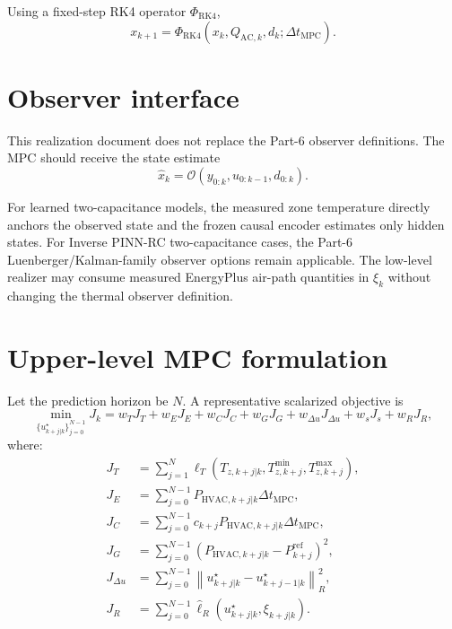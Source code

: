 \documentclass[11pt]{article}
\begin{document}
Using a fixed-step RK4 operator $\Phi_{\mathrm{RK4}}$,
\begin{equation}
x_{k+1}
=
\Phi_{\mathrm{RK4}}
\left(
x_k,
Q_{\mathrm{AC},k},
d_k;
\Delta t_{\mathrm{MPC}}
\right).
\label{eq:rk4-step}
\end{equation}

\section{Observer interface}

This realization document does not replace the Part-6 observer definitions.
The MPC should receive the state estimate
\begin{equation}
\hat x_k
=
\mathcal O
\left(
y_{0:k},
u_{0:k-1},
d_{0:k}
\right).
\label{eq:generic-observer}
\end{equation}

For learned two-capacitance models, the measured zone temperature directly
anchors the observed state and the frozen causal encoder estimates only hidden
states.  For Inverse PINN-RC two-capacitance cases, the Part-6
Luenberger/Kalman-family observer options remain applicable.  The low-level
realizer may consume measured EnergyPlus air-path quantities in $\xi_k$ without
changing the thermal observer definition.

\section{Upper-level MPC formulation}

Let the prediction horizon be $N$.  A representative scalarized objective is
\begin{equation}
\min_{\{u^\star_{k+j|k}\}_{j=0}^{N-1}}
J_k
=
w_T J_T
+
w_E J_E
+
w_C J_C
+
w_G J_G
+
w_{\Delta u}J_{\Delta u}
+
w_s J_s
+
w_R J_R,
\label{eq:mpc-objective}
\end{equation}
where:
\begin{align}
J_T
&=
\sum_{j=1}^{N}
\ell_T
\left(
T_{z,k+j|k},
T_{z,k+j}^{\min},
T_{z,k+j}^{\max}
\right),
\\
J_E
&=
\sum_{j=0}^{N-1}
P_{\mathrm{HVAC},k+j|k}\Delta t_{\mathrm{MPC}},
\\
J_C
&=
\sum_{j=0}^{N-1}
c_{k+j}
P_{\mathrm{HVAC},k+j|k}
\Delta t_{\mathrm{MPC}},
\\
J_G
&=
\sum_{j=0}^{N-1}
\left(
P_{\mathrm{HVAC},k+j|k}
-
P_{k+j}^{\mathrm{ref}}
\right)^2,
\\
J_{\Delta u}
&=
\sum_{j=0}^{N-1}
\left\|
u^\star_{k+j|k}
-
u^\star_{k+j-1|k}
\right\|_{R}^{2},
\\
J_R
&=
\sum_{j=0}^{N-1}
\widehat{\ell}_{R}
\left(
u^\star_{k+j|k},\xi_{k+j|k}
\right).
\end{align}
\end{document}
